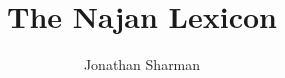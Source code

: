 

\usepackage{fancyhdr}
\fancyhead{}
\fancyhead[L]{\rightmark}
\fancyhead[R]{\leftmark}
\pagestyle{fancy}
\renewcommand{\headrulewidth}{1.5pt}

\newcommand{\entry}[3] {
	\par
    \markboth{#1}{#1} %
    \najBold{#1} %
    [\ipa{#1}] %
    \textsc{#2} %
    $\blacktriangleright$
    #3. %
    \newline
}

\title{The Najan Lexicon}
\author{Jonathan Sharman}



\twocolumn

\maketitle




